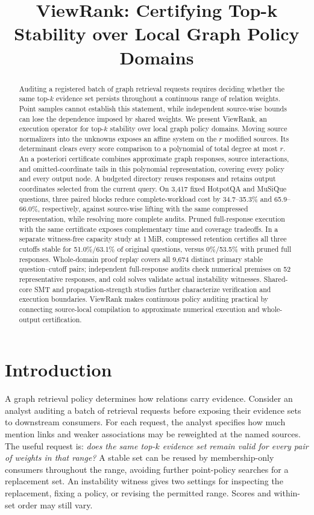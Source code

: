 \documentclass[conference]{IEEEtran}
\title{ViewRank: Certifying Top-k Stability over Local Graph Policy Domains}
\author{\IEEEauthorblockN{Wenji Fu}
\IEEEauthorblockA{Southwestern University of Finance and Economics\\
fuwenji61616@gmail.com\\
\href{https://orcid.org/0009-0003-7757-140X}{ORCID: 0009-0003-7757-140X}}}
\begin{document}
\maketitle
\begin{abstract}
Auditing a registered batch of graph retrieval requests requires deciding whether the same top-$k$ evidence set persists throughout a continuous range of relation weights. Point samples cannot establish this statement, while independent source-wise bounds can lose the dependence imposed by shared weights. We present ViewRank, an execution operator for top-$k$ stability over local graph policy domains. Moving source normalizers into the unknowns exposes an affine system on the $r$ modified sources. Its determinant clears every score comparison to a polynomial of total degree at most $r$. An a posteriori certificate combines approximate graph responses, source interactions, and omitted-coordinate tails in this polynomial representation, covering every policy and every output node. A budgeted directory reuses responses and retains output coordinates selected from the current query. On 3,417 fixed HotpotQA and MuSiQue questions, three paired blocks reduce complete-workload cost by 34.7--35.3\% and 65.9--66.0\%, respectively, against source-wise lifting with the same compressed representation, while resolving more complete audits. Pruned full-response execution with the same certificate exposes complementary time and coverage tradeoffs. In a separate witness-free capacity study at 1\,MiB, compressed retention certifies all three cutoffs stable for 51.0\%/63.1\% of original questions, versus 0\%/53.5\% with pruned full responses. Whole-domain proof replay covers all 9,674 distinct primary stable question--cutoff pairs; independent full-response audits check numerical premises on 52 representative responses, and cold solves validate actual instability witnesses. Shared-core SMT and propagation-strength studies further characterize verification and execution boundaries. ViewRank makes continuous policy auditing practical by connecting source-local compilation to approximate numerical execution and whole-output certification.
\end{abstract}

\section{Introduction}
A graph retrieval policy determines how relations carry evidence. Consider an analyst auditing a batch of retrieval requests before exposing their evidence sets to downstream consumers. For each request, the analyst specifies how much mention links and weaker associations may be reweighted at the named sources. The useful request is: \emph{does the same top-$k$ evidence set remain valid for every pair of weights in that range?} A stable set can be reused by membership-only consumers throughout the range, avoiding further point-policy searches for a replacement set. An instability witness gives two settings for inspecting the replacement, fixing a policy, or revising the permitted range. Scores and within-set order may still vary.
\end{document}
